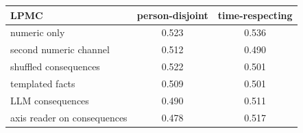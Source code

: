 \begin{tabular}{lcc}
\toprule
LPMC & person-disjoint & time-respecting \\
\midrule
numeric only & 0.523 & 0.536 \\
second numeric channel & 0.512 & 0.490 \\
shuffled consequences & 0.522 & 0.501 \\
templated facts & 0.509 & 0.501 \\
LLM consequences & 0.490 & 0.511 \\
axis reader on consequences & 0.478 & 0.517 \\
\bottomrule
\end{tabular}